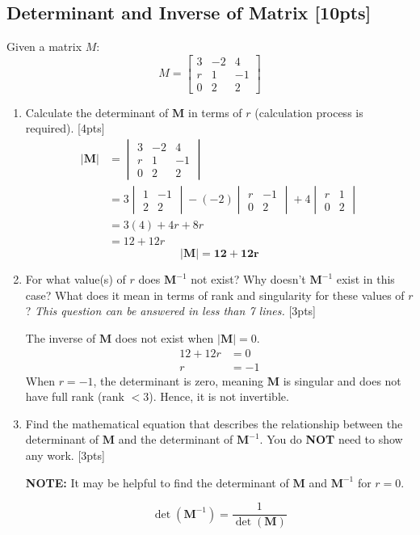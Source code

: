 \documentclass{article}
\begin{document}
\subsection{Determinant and Inverse of Matrix [10pts]}
Given a matrix $M$:
$$M = \begin{bmatrix} 
    3 & -2 & 4 \\ 
    r & 1 & -1 \\
    0 & 2 & 2
\end{bmatrix}$$
\begin{enumerate}[label=(\alph*)]
    \item Calculate the determinant of $\boldsymbol{M}$ in terms of $r$ (calculation process is required). [4pts]
    \begin{align*}
        |\boldsymbol{M}| &= \begin{vmatrix} 3 & -2 & 4 \\ r & 1 & -1 \\ 0 & 2 & 2 \end{vmatrix} \\
        &= 3 \begin{vmatrix} 1 & -1 \\ 2 & 2 \end{vmatrix} - (-2) \begin{vmatrix} r & -1 \\ 0 & 2 \end{vmatrix} + 4 \begin{vmatrix} r & 1 \\ 0 & 2 \end{vmatrix} \\
        &= 3(4) + 4r + 8r \\
        &= 12 + 12r
    \end{align*}
    $$|\boldsymbol{M}| = \mathbf{12 + 12r}$$

    \item For what value(s) of $r$ does $\boldsymbol{M}^{-1}$ not exist? Why doesn't $\boldsymbol{M}^{-1}$ exist in this case? What does it mean in terms of rank and singularity for these values of $r$? \textit{This question can be answered in less than 7 lines. } [3pts]

    The inverse of $\boldsymbol{M}$ does not exist when $|\boldsymbol{M}| = 0$. 
    \begin{align*}
        12 + 12r &= 0 \\
        r &= -1
    \end{align*}
    When $r = -1$, the determinant is zero, meaning $\boldsymbol{M}$ is singular and does not have full rank (rank $< 3$). Hence, it is not invertible.
        
    \item Find the mathematical equation that describes the relationship between the determinant of $\boldsymbol{M}$ and the determinant of $\boldsymbol{M}^{-1}$. You do \textbf{NOT} need to show any work. [3pts]
    \par\textbf{NOTE:} It may be helpful to find the determinant of $\boldsymbol{M}$ and $\boldsymbol{M}^{-1}$ for $r = 0$.

    \[ \det(\boldsymbol{M}^{-1}) = \frac{1}{\det(\boldsymbol{M})} \]

\end{enumerate}
\end{document}
